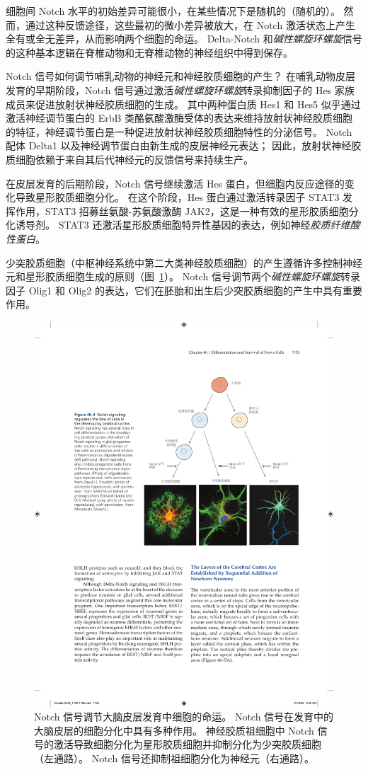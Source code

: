 细胞间 Notch 水平的初始差异可能很小，在某些情况下是随机的（随机的）。
然而，通过这种反馈途径，这些最初的微小差异被放大，在 Notch 激活状态上产生全有或全无差异，从而影响两个细胞的命运。
Delta-Notch 和\textit{碱性螺旋环螺旋}信号的这种基本逻辑在脊椎动物和无脊椎动物的神经组织中得到保存。


Notch 信号如何调节哺乳动物的神经元和神经胶质细胞的产生？
在哺乳动物皮层发育的早期阶段，Notch 信号通过激活\textit{碱性螺旋环螺旋}转录抑制因子的 Hes 家族成员来促进放射状神经胶质细胞的生成。
其中两种蛋白质 Hes1 和 Hes5 似乎通过激活神经调节蛋白的 ErbB 类酪氨酸激酶受体的表达来维持放射状神经胶质细胞的特征，神经调节蛋白是一种促进放射状神经胶质细胞特性的分泌信号。
Notch 配体 Delta1 以及神经调节蛋白由新生成的皮层神经元表达；
因此，放射状神经胶质细胞依赖于来自其后代神经元的反馈信号来持续生产。


在皮层发育的后期阶段，Notch 信号继续激活 Hes 蛋白，但细胞内反应途径的变化导致星形胶质细胞分化。
在这个阶段，Hes 蛋白通过激活转录因子 STAT3 发挥作用，STAT3 招募丝氨酸-苏氨酸激酶 JAK2，这是一种有效的星形胶质细胞分化诱导剂。
STAT3 还激活星形胶质细胞特异性基因的表达，例如神经\textit{胶质纤维酸性蛋白}。


少突胶质细胞（中枢神经系统中第二大类神经胶质细胞）的产生遵循许多控制神经元和星形胶质细胞生成的原则（图~\ref{fig:46_4}）。
Notch 信号调节两个\textit{碱性螺旋环螺旋}转录因子 Olig1 和 Olig2 的表达，它们在胚胎和出生后少突胶质细胞的产生中具有重要作用。


\begin{figure}[htbp]
	\centering
	\includegraphics[width=0.85\linewidth]{chap46/fig_46_4}
	\caption{Notch 信号调节大脑皮层发育中细胞的命运。
		Notch 信号在发育中的大脑皮层的细胞分化中具有多种作用。
		神经胶质祖细胞中 Notch 信号的激活导致细胞分化为星形胶质细胞并抑制分化为少突胶质细胞（左通路）。
		Notch 信号还抑制祖细胞分化为神经元（右通路）。}
	\label{fig:46_4}
\end{figure}


